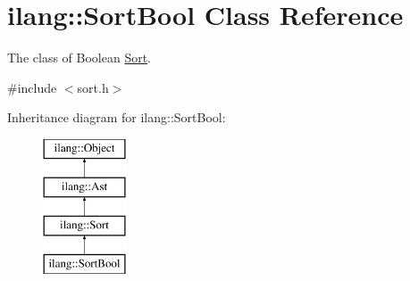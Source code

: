 \hypertarget{classilang_1_1_sort_bool}{}\section{ilang\+:\+:Sort\+Bool Class Reference}
\label{classilang_1_1_sort_bool}


The class of Boolean \mbox{\hyperlink{classilang_1_1_sort}{Sort}}.  




{\ttfamily \#include $<$sort.\+h$>$}

Inheritance diagram for ilang\+:\+:Sort\+Bool\+:\begin{figure}[H]
\begin{center}
\leavevmode
\includegraphics[height=4.000000cm]{classilang_1_1_sort_bool}
\end{center}
\end{figure}
